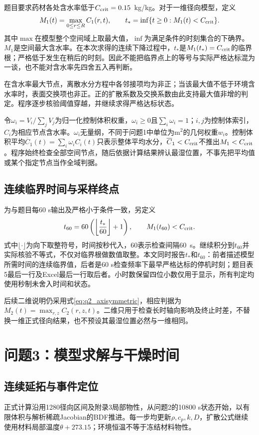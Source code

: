 \documentclass[withoutpreface]{cumcmthesis}
\begin{document}
题目要求药材各处含水率低于$C_{\rm crit}=0.15$~kg/kg。对于一维径向模型，定义
\begin{equation}\label{eq:q3_event}
M_1(t)=\max_{0\le r\le R}C_1(r,t),\qquad
t_* = \inf\{t\ge0:M_1(t)<C_{\rm crit}\}.
\end{equation}
其中$\max$在模型整个空间域上取最大值，$\inf$为满足条件的时刻集合的下确界。$M_1$是空间最大含水率。在本次求得的连续下降过程中，$t_*$是$M_1(t_*)=C_{\rm crit}$的临界根；严格低于发生在稍后的时刻。因此不能把临界点上的等号与实际严格达标混为一谈，也不能对含水率先四舍五入再判断。

在含水率最大节点，离散水分方程中各邻接项均为非正；当该最大值不低于环境含水率时，表面交换项也非正。正的扩散系数及交换系数由此支持最大值非增的判定。程序逐步核验阈值穿越，并继续求得严格达标状态。

令$\omega_i=V_i/\sum_jV_j$为归一化控制体积权重，$\omega_i\ge0$且$\sum_i\omega_i=1$；$i,j$为控制体索引，$C_i$为相应节点含水率。$\omega_i$无量纲，不同于问题1中单位为m$^2$的几何权重$w_i$。控制体积平均$\overline C_1(t)=\sum_i\omega_iC_i(t)$只表示整体平均水分，$\overline C_1<C_{\rm crit}$不推出$M_1<C_{\rm crit}$。程序始终检查全部空间节点，随后依据计算结果辨认最湿位置，不事先把平均值或某个指定节点当作全域判据。

\subsection{连续临界时间与采样终点}
为与题目每60 s输出及严格小于条件一致，另定义
\begin{equation}\label{eq:q3_stop}
t_{60}=60\left(\left\lfloor\frac{t_*}{60}\right\rfloor+1\right),\qquad
M_1(t_{60})<C_{\rm crit}.
\end{equation}
式中$\lfloor\cdot\rfloor$为向下取整符号，时间按秒代入，60表示检查间隔60~s。继续积分到$t_{60}$并实际核验不等式，不仅对临界根做数值取整。本文同时报告$t_*$和$t_{60}$：前者描述模型所需时间的连续临界值，后者是60 s检查频率下最早严格达标的停机时刻；题目表5最后一行及Excel最后一行取后者。小时数保留四位小数仅用于显示，所有判定均使用秒制未舍入时间和状态。

后续二维说明仍采用式\eqref{eq:q2_axisymmetric}，相应判据为$M_2(t)=\max_{r,z}C_2(r,z,t)$。二维只用于检查长时轴向影响及终止时差，不替换一维正式径向结果，也不预设其最湿位置必然与一维相同。
\section{问题3：模型求解与干燥时间}
\subsection{连续延拓与事件定位}
正式计算沿用1280径向区间及附录3局部物性，从问题2的10800 s状态开始，以有限体积与解析稀疏Jacobian的BDF推进。每一步均更新$\rho,c_p,k,D$，扩散公式继续使用材料局部温度$\theta+273.15$；环境恒温不等于冻结材料物性。
\end{document}
